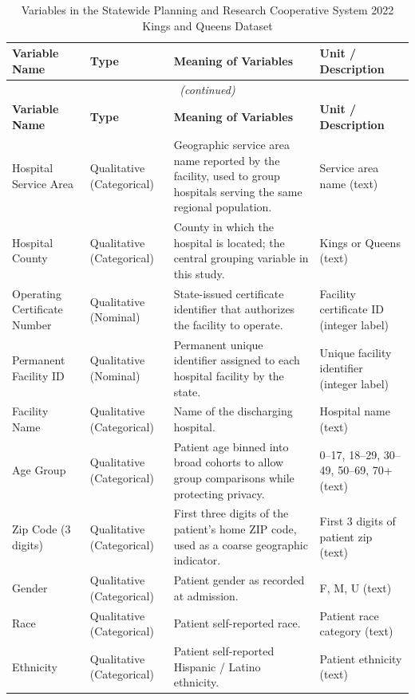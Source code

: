 \documentclass[12pt]{article}
\begin{document}
\begin{longtable}{p{} p{} p{} p{}}
\caption{Variables in the Statewide Planning and Research Cooperative System 2022 Kings and Queens Dataset}
\label{tab:variables} \\
\toprule
\textbf{Variable Name} & \textbf{Type} & \textbf{Meaning of Variables} & \textbf{Unit / Description} \\
\midrule
\endfirsthead
\multicolumn{4}{c}{\textit{(continued)}} \\
\toprule
\textbf{Variable Name} & \textbf{Type} & \textbf{Meaning of Variables} & \textbf{Unit / Description} \\
\midrule
\endhead
Hospital Service Area & Qualitative (Categorical) & Geographic service area name reported by the facility, used to group hospitals serving the same regional population. & Service area name (text) \\
Hospital County & Qualitative (Categorical) & County in which the hospital is located; the central grouping variable in this study. & Kings or Queens (text) \\
Operating Certificate Number & Qualitative (Nominal) & State-issued certificate identifier that authorizes the facility to operate. & Facility certificate ID (integer label) \\
Permanent Facility ID & Qualitative (Nominal) & Permanent unique identifier assigned to each hospital facility by the state. & Unique facility identifier (integer label) \\
Facility Name & Qualitative (Categorical) & Name of the discharging hospital. & Hospital name (text) \\
Age Group & Qualitative (Categorical) & Patient age binned into broad cohorts to allow group comparisons while protecting privacy. & 0--17, 18--29, 30--49, 50--69, 70+ (text) \\
Zip Code (3 digits) & Qualitative (Categorical) & First three digits of the patient's home ZIP code, used as a coarse geographic indicator. & First 3 digits of patient zip (text) \\
Gender & Qualitative (Categorical) & Patient gender as recorded at admission. & F, M, U (text) \\
Race & Qualitative (Categorical) & Patient self-reported race. & Patient race category (text) \\
Ethnicity & Qualitative (Categorical) & Patient self-reported Hispanic / Latino ethnicity. & Patient ethnicity (text) \\

\end{longtable}
\end{document}
